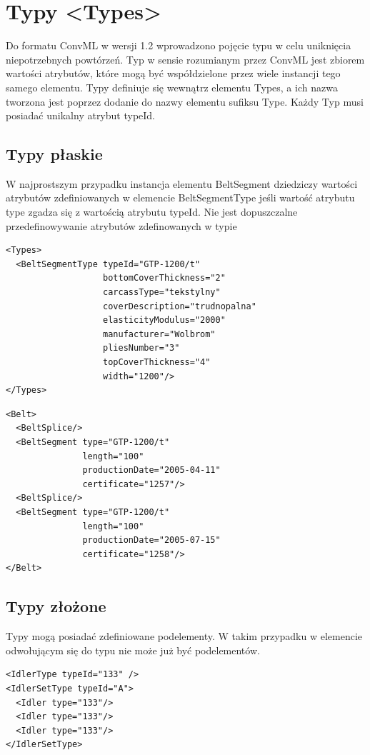 \documentclass[12pt,a4paper]{article}
\begin{document}
\section{Typy <Types>}
Do formatu ConvML w wersji 1.2 wprowadzono pojęcie typu w celu uniknięcia
niepotrzebnych powtórzeń.  Typ w sensie rozumianym przez ConvML jest zbiorem
wartości atrybutów, które mogą być współdzielone przez wiele instancji tego
samego elementu.  Typy definiuje się wewnątrz elementu Types, a ich nazwa
tworzona jest poprzez dodanie do nazwy elementu sufiksu Type. Każdy Typ musi
posiadać unikalny atrybut typeId.


\subsection{Typy płaskie}
W najprostszym przypadku instancja elementu BeltSegment dziedziczy wartości
atrybutów zdefiniowanych w
elemencie BeltSegmentType jeśli wartość atrybutu type zgadza się z wartością
atrybutu typeId.  Nie jest dopuszczalne przedefinowywanie atrybutów zdefinowanych
w typie

\begin{verbatim}
<Types>
  <BeltSegmentType typeId="GTP-1200/t"
                   bottomCoverThickness="2"
                   carcassType="tekstylny"
                   coverDescription="trudnopalna"
                   elasticityModulus="2000"
                   manufacturer="Wolbrom"
                   pliesNumber="3"
                   topCoverThickness="4"
                   width="1200"/>
</Types>
\end{verbatim}

\begin{verbatim}
<Belt>
  <BeltSplice/>
  <BeltSegment type="GTP-1200/t"
               length="100"
               productionDate="2005-04-11"
               certificate="1257"/>
  <BeltSplice/>
  <BeltSegment type="GTP-1200/t"
               length="100"
               productionDate="2005-07-15"
               certificate="1258"/>
</Belt>
\end{verbatim}


\subsection{Typy złożone}
Typy mogą posiadać zdefiniowane podelementy.  W takim przypadku w elemencie
odwołującym się do typu nie może już być podelementów. 

\begin{verbatim}
<IdlerType typeId="133" />
<IdlerSetType typeId="A">
  <Idler type="133"/>
  <Idler type="133"/>
  <Idler type="133"/>
</IdlerSetType>
\end{verbatim}
\end{document}
